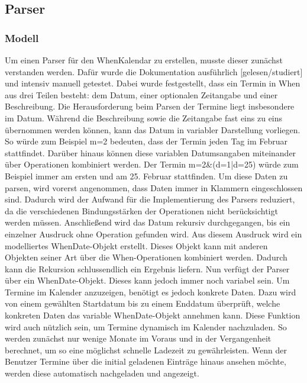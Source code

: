 \subsection{Parser}\label{subsection:imp:parser}
\subsubsection{Modell}
Um einen Parser für den WhenKalendar zu erstellen, musste dieser zunächst verstanden werden. Dafür wurde die Dokumentation ausführlich [gelesen/studiert] und intensiv manuell getestet.\newline%
Dabei wurde festgestellt, dass ein Termin in When aus drei Teilen besteht: dem Datum, einer optionalen Zeitangabe und einer Beschreibung.%
Die Herausforderung beim Parsen der Termine liegt insbesondere im Datum. Während die Beschreibung sowie die Zeitangabe fast eins zu eins übernommen werden können, kann das Datum in variabler Darstellung vorliegen. So würde zum Beispiel \glqq m=2\grqq{} bedeuten, dass der Termin jeden Tag im Februar stattfindet.
Darüber hinaus können diese variablen Datumsangaben miteinander über Operationen kombiniert werden. Der Termin \glqq m=2\&(d=1|d=25)\grqq{} würde zum Beispiel immer am ersten und am 25. Februar stattfinden.
\newline
\myNewSection
Um diese Daten zu parsen, wird vorerst angenommen, dass Daten immer in Klammern eingeschlossen sind. Dadurch wird der Aufwand für die Implementierung des Parsers reduziert, da die verschiedenen Bindungsstärken der Operationen nicht berücksichtigt werden müssen. %
Anschließend wird das Datum rekursiv durchgegangen, bis ein einzelner Ausdruck ohne Operation gefunden wird. Aus diesem Ausdruck wird ein modelliertes WhenDate-Objekt erstellt. Dieses Objekt kann mit anderen Objekten seiner Art über die When-Operationen kombiniert werden. Dadurch kann die Rekursion schlussendlich ein Ergebnis liefern. %
\newline
\myNewSection
Nun verfügt der Parser über ein WhenDate-Objekt. Dieses kann jedoch immer noch variabel sein. Um Termine im Kalender anzuzeigen, benötigt es jedoch konkrete Daten. Dazu wird von einem gewählten Startdatum bis zu einem Enddatum überprüft, welche konkreten Daten das variable WhenDate-Objekt annehmen kann. Diese Funktion wird auch nützlich sein, um Termine dynamisch im Kalender nachzuladen. So werden zunächst nur wenige Monate im Voraus und in der Vergangenheit berechnet, um so eine möglichst schnelle Ladezeit zu gewährleisten. Wenn der Benutzer Termine über die initial geladenen Einträge hinaus ansehen möchte, werden diese automatisch nachgeladen und angezeigt.\newline%
